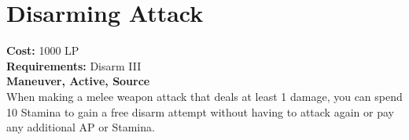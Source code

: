 \section{Disarming Attack}\label{maneuver:disarmingAttack}
\textbf{Cost:} 1000 LP\\
\textbf{Requirements:} Disarm III\\
\textbf{Maneuver, Active, Source}\\
When making a melee weapon attack that deals at least 1 damage, you can spend 10 Stamina to gain a free disarm attempt without having to attack again or pay any additional AP or Stamina.\\

